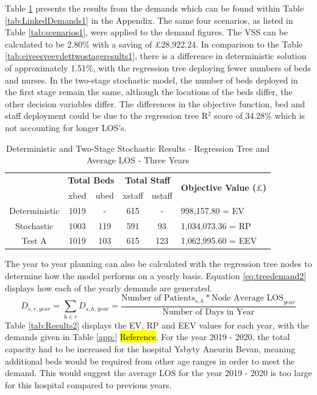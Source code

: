 \documentclass[../thesis.tex]{subfiles}
\begin{document}
Table \ref{tab:Results1} presents the results from the demands which can be found within Table \ref{tab:LinkedDemands1} in the Appendix. The same four scenarios, as listed in Table \ref{tab:scenarios1}, were applied to the demand figures. The VSS can be calculated to be 2.80\% with a saving of $\pounds$28,922.24. In comparison to the Table \ref{tab:eiveesveevdettwostageresults1}, there is a difference in deterministic solution of approximately 1.51\%, with the regression tree deploying fewer numbers of beds and nurses. In the two-stage stochastic model, the number of beds deployed in the first stage remain the same, although the locations of the beds differ, the other decision variables differ. The differences in the objective function, bed and staff deployment could be due to the regression tree R$^{2}$ score of 34.28\% which is not accounting for longer LOS's. 

\begin{table}[h!]
    \centering
    \begin{tabular}{cccccl}\toprule
 & \multicolumn{2}{l}{\textbf{Total Beds}} & \multicolumn{2}{c}{\textbf{Total Staff}} & \multirow{2}{*}{\textbf{Objective Value ($\pounds$)}}\\ \cmidrule(lr){2-3} \cmidrule(lr){4-5}
 & xbed           & ubed          & xstaff         & ustaff         \\ \midrule
    Deterministic      & 1019 & - & 615 & - & 998,157.80 = EV \\ \midrule
    Stochastic &1003& 119& 591 & 93&  1,034,073.36 = RP \\ \midrule
    Test A & 1019 & 103 & 615 & 123 & 1,062,995.60 = EEV \\\bottomrule
    \end{tabular}
    \caption{Deterministic and Two-Stage Stochastic Results - Regression Tree and Average LOS - Three Years}
    \label{tab:Results1}
\end{table}

The year to year planning can also be calculated with the regression tree nodes to determine how the model performs on a yearly basis. Equation \eqref{eq:treedemand2} displays how each of the yearly demands are generated.
\begin{equation}\label{eq:treedemand2}
        D_{s,r,year} = \sum\limits_{h \in r} D_{s,h,year} = \frac{\text{Number of Patients}_{s,h}* {\text{Node Average LOS}}_{year}}{\text{Number of Days in Year}}
\end{equation}
Table \ref{tab:Results2} displays the EV, RP and EEV values for each year, with the demands given in Table \ref{app:} \hl{Reference}. For the year 2019 - 2020, the total capacity had to be increased for the hospital Ysbyty Aneurin Bevan, meaning additional beds would be required from other age ranges in order to meet the demand. This would suggest the average LOS for the year 2019 - 2020 is too large for this hospital compared to previous years.
\end{document}
